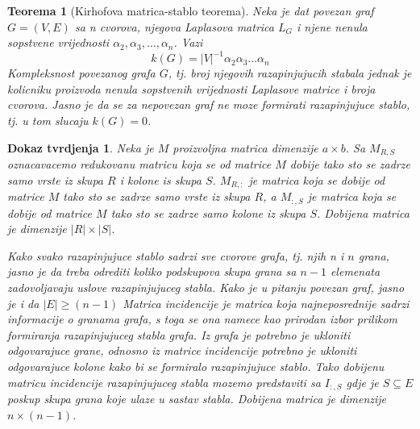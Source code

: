 \documentclass[11pt]{article}
\newtheorem{theorem}{Teorema}
\newtheorem*{custom_proof}{Dokaz tvrdjenja}
\begin{document}
		\begin{theorem}[Kirhofova matrica-stablo teorema]
		Neka je dat povezan graf $G= (V,E) $ sa n cvorova, njegova Laplasova matrica $L_G$ i njene nenula sopstvene vrijednosti $\alpha_2, \alpha_3, \dots, \alpha_n$. Vazi
		\[
			k(G) = |V|^{-1}\alpha_2 \alpha_3 \dots \alpha_n
		\]
		Kompleksnost povezanog grafa $G$, tj. broj njegovih razapinjujucih stabala jednak je kolicniku proizvoda nenula sopstvenih vrijednosti Laplasove matrice i broja cvorova. 
		Jasno je da se za nepovezan graf ne moze formirati razapinjujuce stablo, tj. u tom slucaju $k(G) = 0$. 
		\end{theorem}
	
		\begin{custom_proof}
	
		Neka je $M$ proizvoljna matrica dimenzije $a \times b$. Sa $M_{R,S}$ oznacavacemo redukovanu matricu koja se od matrice $M$ dobije tako sto se zadrze samo vrste iz skupa $R$ i kolone is skupa $S$. 
		$M_{R,:}$ je matrica koja se dobije od matrice $M$ tako sto se zadrze samo vrste iz skupa $R$, a $M_{:,S}$ je matrica koja se dobije od matrice $M$ tako sto se zadrze samo kolone iz skupa $S$.
		Dobijena matrica je dimenzije $|R| \times |S|$.
	
		Kako svako razapinjujuce stablo sadrzi sve cvorove grafa, tj. njih n
		i $n$ grana, jasno je da treba odrediti koliko podskupova skupa grana sa $n-1$ elemenata zadovoljavaju uslove razapinjujuceg stabla. Kako je u pitanju povezan graf, jasno je i da $|E| \geq (n-1)$
		Matrica incidencije je matrica koja najneposrednije sadrzi informacije o granama grafa, s toga se ona namece kao prirodan izbor prilikom formiranja razapinjujuceg stabla grafa.
	        Iz grafa je potrebno je ukloniti odgovarajuce grane, odnosno iz matrice incidencije potrebno je ukloniti odgovarajuce kolone kako bi se formiralo razapinjujuce stablo. 
		Tako dobijenu matricu incidencije razapinjujuceg stabla mozemo predstaviti sa $I_{:,S}$ gdje je $S \subseteq E$ poskup skupa grana koje ulaze u sastav stabla. Dobijena matrica je dimenzije $n \times (n - 1)$.
	

\end{custom_proof}
\end{document}
